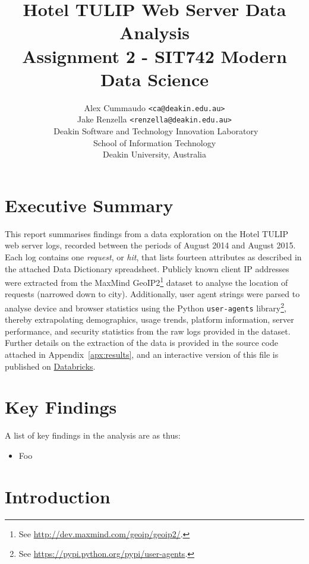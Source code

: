 \documentclass[12pt,titlepage]{article}
\author{Alex Cummaudo \texttt{<ca@deakin.edu.au>}\\ Jake Renzella \texttt{<renzella@deakin.edu.au>}\\ Deakin Software and Technology Innovation Laboratory\\School of Information Technology\\Deakin University, Australia}
\title{Hotel TULIP Web Server Data Analysis\\\normalsize{\bfseries Assignment 2 - SIT742 Modern Data Science}}
\begin{document}
\maketitle

\section*{Executive Summary}

This report summarises findings from a data exploration on the Hotel TULIP web server logs, recorded between the periods of August 2014 and August 2015. Each log contains one \textit{request}, or \textit{hit}, that lists fourteen attributes as described in the attached Data Dictionary spreadsheet. Publicly known client IP addresses were extracted from the MaxMind GeoIP2\footnote{See \url{http://dev.maxmind.com/geoip/geoip2/}.} dataset to analyse the location of requests (narrowed down to city). Additionally, user agent strings were parsed to analyse device and browser statistics using the Python \texttt{user-agents} library\footnote{See \url{https://pypi.python.org/pypi/user-agents}.}, thereby extrapolating demographics, usage trends, platform information, server performance, and security statistics from the raw logs provided in the dataset. Further details on the extraction of the data is provided in the source code attached in Appendix~\ref{apx:results}, and an interactive version of this file is published on \href{https://databricks-prod-cloudfront.cloud.databricks.com/public/4027ec902e239c93eaaa8714f173bcfc/7364378259770565/3552971541306612/8155742302574378/latest.html}{Databricks}.

\newpage

\tableofcontents\newpage
\listoffigures\newpage

\newpage
\section{Key Findings}

A list of key findings in the analysis are as thus:

\begin{itemize}
  \item Foo
\end{itemize}

\newpage
\section{Introduction}
\end{document}
